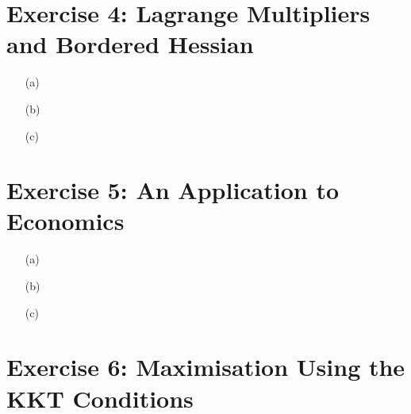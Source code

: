 \documentclass[unicode,11pt,a4paper,oneside,numbers=endperiod,openany]{scrartcl}
\begin{document}

\section*{Exercise 4: Lagrange Multipliers and Bordered Hessian}
\begin{enumerate}
	\item [(a)] 
	\item [(b)] 
	\item [(c)] 
\end{enumerate}


\section*{Exercise 5: An Application to Economics}
\begin{itemize}
	\item [(a)] 
	\item [(b)] 
	\item [(c)]
\end{itemize}


\section*{Exercise 6: Maximisation Using the KKT Conditions}

\end{document}

